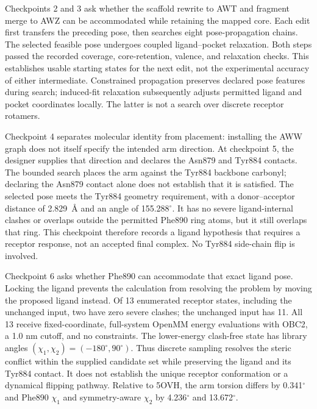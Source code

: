 \documentclass[11pt]{article}
\begin{document}
\begin{small}
Checkpoints 2 and 3 ask whether the scaffold rewrite to AWT and fragment merge to AWZ can be accommodated while retaining the mapped core. Each edit first transfers the preceding pose, then searches eight pose-propagation chains. The selected feasible pose undergoes coupled ligand--pocket relaxation. Both steps passed the recorded coverage, core-retention, valence, and relaxation checks. This establishes usable starting states for the next edit, not the experimental accuracy of either intermediate. Constrained propagation preserves declared pose features during search; induced-fit relaxation subsequently adjusts permitted ligand and pocket coordinates locally. The latter is not a search over discrete receptor rotamers.

Checkpoint 4 separates molecular identity from placement: installing the AWW graph does not itself specify the intended arm direction. At checkpoint 5, the designer supplies that direction and declares the Asn879 and Tyr884 contacts. The bounded search places the arm against the Tyr884 backbone carbonyl; declaring the Asn879 contact alone does not establish that it is satisfied. The selected pose meets the Tyr884 geometry requirement, with a donor--acceptor distance of 2.829~\AA{} and an angle of 155.288$^{\circ}$. It has no severe ligand-internal clashes or overlaps outside the permitted Phe890 ring atoms, but it still overlaps that ring. This checkpoint therefore records a ligand hypothesis that requires a receptor response, not an accepted final complex. No Tyr884 side-chain flip is involved.

Checkpoint 6 asks whether Phe890 can accommodate that exact ligand pose. Locking the ligand prevents the calculation from resolving the problem by moving the proposed ligand instead. Of 13 enumerated receptor states, including the unchanged input, two have zero severe clashes; the unchanged input has 11. All 13 receive fixed-coordinate, full-system OpenMM energy evaluations with OBC2, a 1.0 nm cutoff, and no constraints. The lower-energy clash-free state has library angles $(\chi_1,\chi_2)=(-180^{\circ},90^{\circ})$. Thus discrete sampling resolves the steric conflict within the supplied candidate set while preserving the ligand and its Tyr884 contact. It does not establish the unique receptor conformation or a dynamical flipping pathway. Relative to 5OVH, the arm torsion differs by 0.341$^{\circ}$ and Phe890 $\chi_1$ and symmetry-aware $\chi_2$ by 4.236$^{\circ}$ and 13.672$^{\circ}$.


\end{small}
\end{document}
